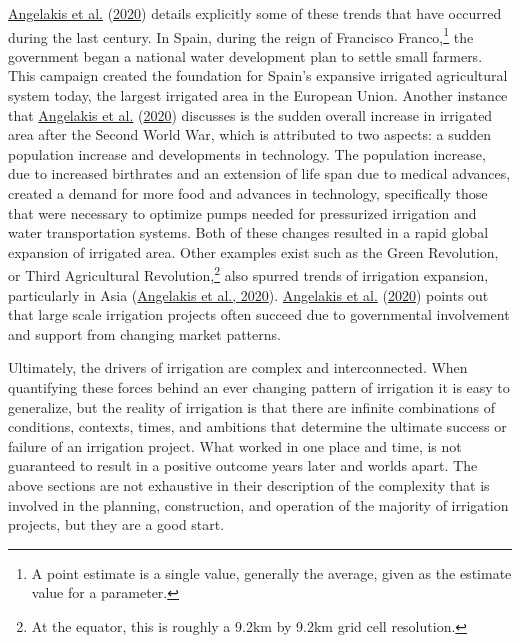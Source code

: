 \documentclass[12pt,twoside]{reedthesis}
\begin{document}
\protect\hyperlink{ref-angelakisIrrigationWorldAgricultural2020}{Angelakis et al.} (\protect\hyperlink{ref-angelakisIrrigationWorldAgricultural2020}{2020}) details explicitly some of these trends that have occurred during the last century. In Spain, during the reign of Francisco Franco,\footnote{A point estimate is a single value, generally the average, given as the estimate value for a parameter.} the government began a national water development plan to settle small farmers. This campaign created the foundation for Spain's expansive irrigated agricultural system today, the largest irrigated area in the European Union. Another instance that \protect\hyperlink{ref-angelakisIrrigationWorldAgricultural2020}{Angelakis et al.} (\protect\hyperlink{ref-angelakisIrrigationWorldAgricultural2020}{2020}) discusses is the sudden overall increase in irrigated area after the Second World War, which is attributed to two aspects: a sudden population increase and developments in technology. The population increase, due to increased birthrates and an extension of life span due to medical advances, created a demand for more food and advances in technology, specifically those that were necessary to optimize pumps needed for pressurized irrigation and water transportation systems. Both of these changes resulted in a rapid global expansion of irrigated area. Other examples exist such as the Green Revolution, or Third Agricultural Revolution,\footnote{At the equator, this is roughly a 9.2km by 9.2km grid cell resolution.} also spurred trends of irrigation expansion, particularly in Asia (\protect\hyperlink{ref-angelakisIrrigationWorldAgricultural2020}{Angelakis et al., 2020}). \protect\hyperlink{ref-angelakisIrrigationWorldAgricultural2020}{Angelakis et al.} (\protect\hyperlink{ref-angelakisIrrigationWorldAgricultural2020}{2020}) points out that large scale irrigation projects often succeed due to governmental involvement and support from changing market patterns.

\bigskip

Ultimately, the drivers of irrigation are complex and interconnected. When quantifying these forces behind an ever changing pattern of irrigation it is easy to generalize, but the reality of irrigation is that there are infinite combinations of conditions, contexts, times, and ambitions that determine the ultimate success or failure of an irrigation project. What worked in one place and time, is not guaranteed to result in a positive outcome years later and worlds apart. The above sections are not exhaustive in their description of the complexity that is involved in the planning, construction, and operation of the majority of irrigation projects, but they are a good start.
\end{document}
